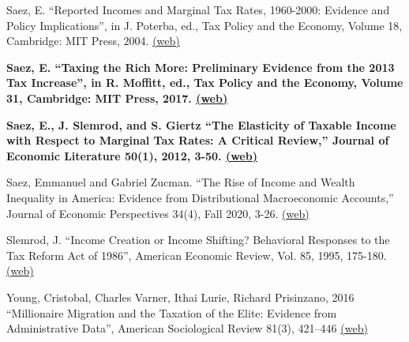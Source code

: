 \documentclass[landscape]{slides}
\begin{document}
\begin{slide}
{Saez, E. ``Reported Incomes and Marginal Tax Rates, 1960-2000: Evidence and Policy Implications'', in J. Poterba, ed., Tax Policy and the Economy, Volume 18, Cambridge: MIT Press, 2004. \href{http://www.jstor.org/stable/pdfplus/20061888.pdf} {(web)}

\textbf{Saez, E. ``Taxing the Rich More: Preliminary Evidence from the 2013 Tax Increase'', in R. Moffitt, ed., Tax Policy and the Economy, Volume 31, Cambridge: MIT Press, 2017. \href{http://eml.berkeley.edu/~saez/saezNBERWP16TPE.pdf} {(web)} }

\textbf{Saez, E., J. Slemrod, and S. Giertz ``The Elasticity of Taxable Income with Respect to Marginal Tax Rates: A Critical Review,'' Journal of Economic Literature 50(1), 2012, 3-50. \href{http://elsa.berkeley.edu/~saez/saez-slemrod-giertzJEL12.pdf} {(web)}}

Saez, Emmanuel and Gabriel Zucman. ``The Rise of Income and Wealth Inequality in America: Evidence from Distributional Macroeconomic Accounts,'' Journal of Economic Perspectives 34(4), Fall 2020, 3-26.
\href{https://eml.berkeley.edu/~saez/SaezZucman2020JEP.pdf}{(web)} 


Slemrod, J. ``Income Creation or Income Shifting? Behavioral Responses to the Tax Reform Act of 1986'', American Economic Review, Vol. 85, 1995, 175-180. \href{http://links.jstor.org/stable/pdfplus/2117914.pdf} {(web)}

Young, Cristobal, Charles Varner, Ithai Lurie, Richard Prisinzano, 2016 ``Millionaire Migration and the Taxation of the Elite: Evidence from Administrative Data'', American Sociological Review 81(3), 421--446
\href{http://elsa.berkeley.edu/~saez/course/Millionaire_Migration_and_the_Taxtion_of_the_Elite.pdf} {(web)}


}

\end{slide}
\end{document}
